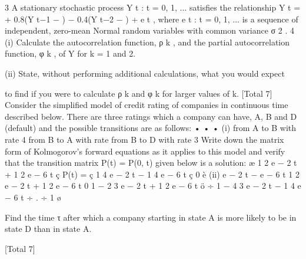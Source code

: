 3
A stationary stochastic process {Y t : t = 0, 1, ...} satisfies the relationship
Y t = \mu + 0.8(Y t−1 − \mu) − 0.4(Y t−2 − \mu) + e t ,
where {e t : t = 0, 1, ...} is a sequence of independent, zero-mean Normal random
variables with common variance σ 2 .
4
(i) Calculate the autocorrelation function, ρ k , and the partial autocorrelation
function, φ k , of Y for k = 1 and 2.

(ii) State, without performing additional calculations, what you would expect

to find if you were to calculate ρ k and φ k for larger values of k.
[Total 7]
Consider the simplified model of credit rating of companies in continuous time
described below. There are three ratings which a company can have, A, B and D
(default) and the possible transitions are as follows:
•
•
•
(i)
from A to B with rate 4\alpha
from B to A with rate \alpha
from B to D with rate 3\alpha
Write down the matrix form of Kolmogorov’s forward equations as it
applies to this model and verify that the transition matrix P(t) = P(0, t)
given below is a solution:
æ 1 2 e − 2 \alpha t + 1 2 e − 6 \alpha t
ç
P(t) = ç 1 4 e − 2 \alpha t − 1 4 e − 6 \alpha t
ç
0
è
(ii)
e − 2 \alpha t − e − 6 \alpha t
1
2
e − 2 \alpha t + 1 2 e − 6 \alpha t
0
1 − 2 3 e − 2 \alpha t + 1 2 e − 6 \alpha t ö
÷
1 − 4 3 e − 2 \alpha t − 1 4 e − 6 \alpha t ÷ .
÷
1
ø

Find the time τ after which a company starting in state A is more likely to
be in state D than in state A.

[Total 7]

